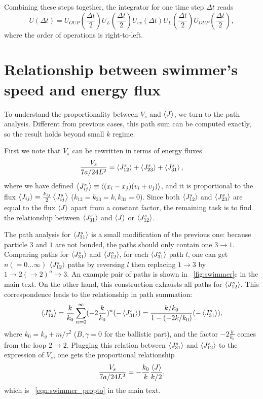 \documentclass[
 amsmath,amssymb,
 aps,
 pre,
 longbibliography,
 10pt, onecolumn,
 notitlepage
]{revtex4-1}
\begin{document}
Combining these steps together, the integrator for one time step $\Delta t$ reads
\begin{equation}
    U(\Delta t) = U_{OUP}(\frac{\Delta t}{2})U_{L}(\frac{\Delta t}{2})U_{vv}(\Delta t)U_{L}(\frac{\Delta t}{2})U_{OUP}(\frac{\Delta t}{2}),
\end{equation}
where the order of operations is right-to-left.


\section{Relationship between swimmer's speed and energy flux}
To understand the proportionality between $V_s$ and $\expval{J}$, we turn to the path analysis. Different from previous cases, this path sum can be computed exactly, so the result holds beyond small $k$ regime.

First we note that $V_s$ can be rewritten in terms of energy fluxes
\begin{equation}
    \frac{V_s}{7a/24L^2} = \expval{J_{12}^s} + \expval{J_{23}^s} + \expval{J_{31}^s},
\end{equation} 
where we have defined $\expval{J_{ij}^s} \equiv \expval{(x_i-x_j)(v_i+v_j)}$, and it is proportional to the flux $\expval{J_{ij}} = \frac{k_{ij}}{2}\expval{J_{ij}^s}$ ($k_{12}=k_{23}=k, k_{31}=0$). 
Since both $\expval{J_{12}^s}$ and $\expval{J_{23}^s}$ are equal to the flux $\expval{J}$ apart from a constant factor, the remaining task is to find the relationship between $\expval{J_{31}^s}$ and $\expval{J}$ or $\expval{J_{12}^s}$.

The path analysis for $\expval{J_{31}^s}$ is a small modification of the previous one: because particle $3$ and $1$ are not bonded, the paths should only contain one $3\rightarrow 1$. 
Comparing paths for $\expval{J_{31}^s}$ and $\expval{J_{12}^s}$, for each $\expval{J_{31}^s}$ path $l$, one can get $n (=0\dots \infty)$ $\expval{J_{12}^s}$ paths by reversing $l$ then replacing $1\rightarrow 3$ by $1\rightarrow 2(\rightarrow 2)^n \rightarrow 3$. An example pair of paths is shown in \figurename~\ref{fig:swimmer}c in the main text. 
On the other hand, this construction exhausts all paths for $\expval{J_{12}^s}$. This correspondence leads to the relationship in path summation: 
\begin{equation}
    \expval{J_{12}^s} = \frac{k}{k_0}\sum_{n=0}^\infty (-2\frac{k}{k_0})^n (-\expval{J_{31}^s}) = \frac{k/k_0}{1-(-2k/k_0)} (-\expval{J_{31}^s}), 
\end{equation}
where $k_0 = k_g + m/\tau^2$ ($B,\gamma=0$ for the ballistic part), and the factor $-2\frac{k}{k_0}$ comes from the loop $2\rightarrow 2$.
Plugging this relation between $\expval{J_{31}^s}$ and $\expval{J_{12}^s}$ to the expression of $V_s$, one gets the proportional relationship
\begin{equation}
    \frac{V_s}{7a/24L^2} = -\frac{k_0}{k} \frac{\expval{J}}{k/2},
\end{equation}
which is \eqnname~\eqref{eqn:swimmer_propto} in the main text.
\end{document}
